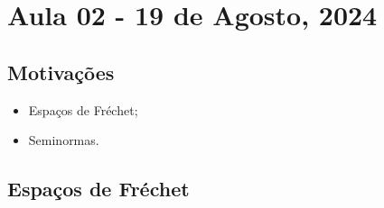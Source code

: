 \documentclass[../distribution_theory_notes.tex]{subfiles}
\begin{document}
\section{Aula 02 - 19 de Agosto, 2024}
\subsection{Motivações}
\begin{itemize}
	\item Espaços de Fréchet;
	\item Seminormas.
\end{itemize}
\subsection{Espaços de Fréchet}
\end{document}
